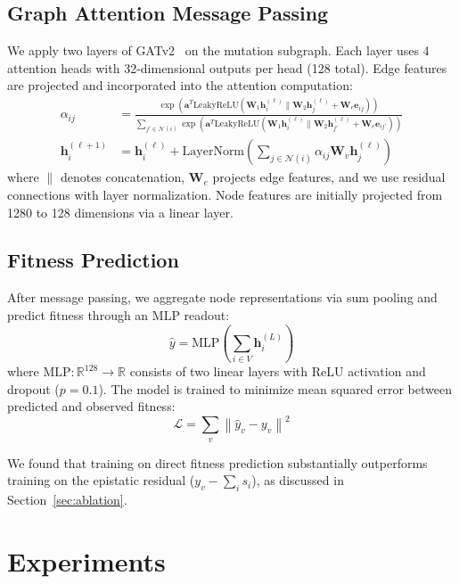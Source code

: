 \documentclass{article}
\newcommand{\bh}{\mathbf{h}}
\newcommand{\R}{\mathbb{R}}
\begin{document}
\subsection{Graph Attention Message Passing}

We apply two layers of GATv2~\citep{brody2022how} on the mutation subgraph.
Each layer uses 4 attention heads with 32-dimensional outputs per head (128 total).
Edge features are projected and incorporated into the attention computation:
\begin{align}
    \alpha_{ij} &= \frac{\exp\left(\mathbf{a}^T \text{LeakyReLU}\left(\mathbf{W}_1 \bh_i^{(\ell)} \| \mathbf{W}_2 \bh_j^{(\ell)} + \mathbf{W}_e \mathbf{e}_{ij}\right)\right)}{\sum_{j' \in \mathcal{N}(i)} \exp\left(\mathbf{a}^T \text{LeakyReLU}\left(\mathbf{W}_1 \bh_i^{(\ell)} \| \mathbf{W}_2 \bh_{j'}^{(\ell)} + \mathbf{W}_e \mathbf{e}_{ij'}\right)\right)} \\
    \bh_i^{(\ell+1)} &= \bh_i^{(\ell)} + \text{LayerNorm}\left(\sum_{j \in \mathcal{N}(i)} \alpha_{ij} \mathbf{W}_v \bh_j^{(\ell)}\right)
\end{align}
where $\|$ denotes concatenation, $\mathbf{W}_e$ projects edge features, and we use residual connections with layer normalization.
Node features are initially projected from 1280 to 128 dimensions via a linear layer.

\subsection{Fitness Prediction}

After message passing, we aggregate node representations via sum pooling and predict fitness through an MLP readout:
\begin{equation}
    \hat{y} = \text{MLP}\left(\sum_{i \in V} \bh_i^{(L)}\right)
\end{equation}
where $\text{MLP}: \R^{128} \to \R$ consists of two linear layers with ReLU activation and dropout ($p=0.1$).
The model is trained to minimize mean squared error between predicted and observed fitness:
\begin{equation}
    \mathcal{L} = \sum_v \left\| \hat{y}_v - y_v \right\|^2
\end{equation}

We found that training on direct fitness prediction substantially outperforms training on the epistatic residual ($y_v - \sum_i s_i$), as discussed in Section~\ref{sec:ablation}.

\section{Experiments}
\label{sec:experiments}
\end{document}
